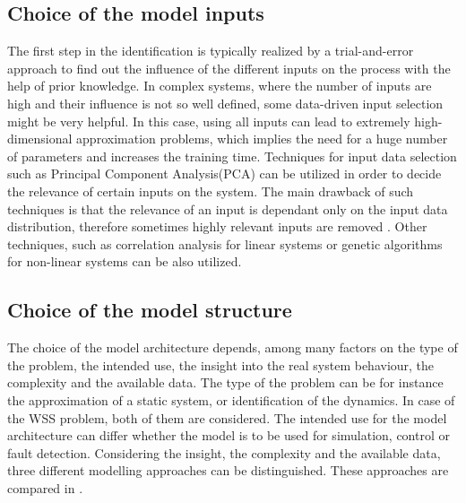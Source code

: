 \vspace{-3mm}

\subsection{Choice of the model inputs}
\label{choice_of_the_model_inputs}

The first step in the identification is typically realized by a trial-and-error approach to find out the influence of the different inputs on the process with the help of prior knowledge. In complex systems, where the number of inputs are high and their influence is not so well defined, some data-driven input selection might be very helpful. In this case, using all inputs can lead to extremely high-dimensional approximation problems, which implies the need for a huge number of parameters and increases the training time. Techniques for input data selection such as Principal Component Analysis(PCA) can be utilized in order to decide the relevance of certain inputs on the system. The main drawback of such techniques is that the relevance of an input is dependant only on the input data distribution, therefore sometimes highly relevant inputs are removed \cite{nelles2013nonlinear}.  Other techniques, such as correlation analysis for linear systems or genetic algorithms for non-linear systems can be also utilized.

\vspace{-3mm}
\subsection{Choice of the model structure}
\label{choice_of_the_model_architecture}

The choice of the model architecture depends, among many factors on the type of the problem, the intended use, the insight into the real system behaviour, the complexity and the available data. The type of the problem can be for instance the approximation of a static system, or identification of the dynamics. In case of the WSS problem, both of them are considered. The intended use for the model architecture can differ whether the model is to be used for simulation, control or fault detection. Considering the insight, the complexity and the available data, three different modelling approaches can be distinguished\cite{nelles2013nonlinear}. These approaches are compared in . 

\vspace{-3mm}

